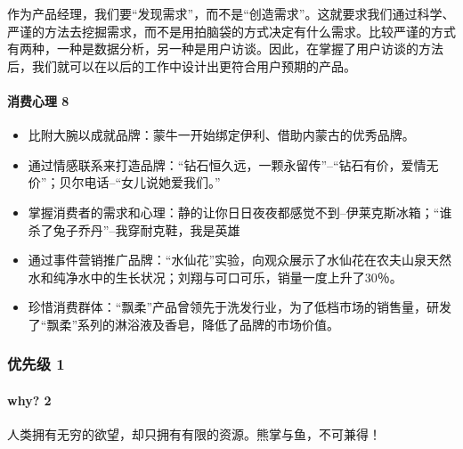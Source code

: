 \documentclass[letterpaper,11pt,english]{sphinxmanual}
\begin{document}
作为产品经理，我们要“发现需求”，而不是“创造需求”。这就要求我们通过科学、严谨的方法去挖掘需求，而不是用拍脑袋的方式决定有什么需求。比较严谨的方式有两种，一种是数据分析，另一种是用户访谈。因此，在掌握了用户访谈的方法后，我们就可以在以后的工作中设计出更符合用户预期的产品。


\paragraph{消费心理 8\sphinxfootnotemark[164]}
\label{\detokenize{chapter_skill/users_analysis:id25}}%
\begin{footnotetext}[164]\sphinxAtStartFootnote
{}
%
\end{footnotetext}\ignorespaces \begin{itemize}
\item {} 
比附大腕以成就品牌：蒙牛一开始绑定伊利、借助内蒙古的优秀品牌。

\item {} 
通过情感联系来打造品牌：“钻石恒久远，一颗永留传”–“钻石有价，爱情无价”；贝尔电话–“女儿说她爱我们。”

\item {} 
掌握消费者的需求和心理：静的让你日日夜夜都感觉不到–伊莱克斯冰箱；“谁杀了兔子乔丹”–我穿耐克鞋，我是英雄

\item {} 
通过事件营销推广品牌：“水仙花”实验，向观众展示了水仙花在农夫山泉天然水和纯净水中的生长状况；刘翔与可口可乐，销量一度上升了30％。

\item {} 
珍惜消费群体：“飘柔”产品曾领先于洗发行业，为了低档市场的销售量，研发了“飘柔”系列的淋浴液及香皂，降低了品牌的市场价值。

\end{itemize}


\subsubsection{优先级 1\sphinxfootnotemark[165]}
\label{\detokenize{chapter_skill/priority:id1}}\label{\detokenize{chapter_skill/priority::doc}}%
\begin{footnotetext}[165]\sphinxAtStartFootnote
{}
%
\end{footnotetext}\ignorespaces 

\paragraph{why? 2\sphinxfootnotemark[166]}
\label{\detokenize{chapter_skill/priority:why-2}}%
\begin{footnotetext}[166]\sphinxAtStartFootnote
{}
%
\end{footnotetext}\ignorespaces 
人类拥有无穷的欲望，却只拥有有限的资源。熊掌与鱼，不可兼得！
\end{document}
